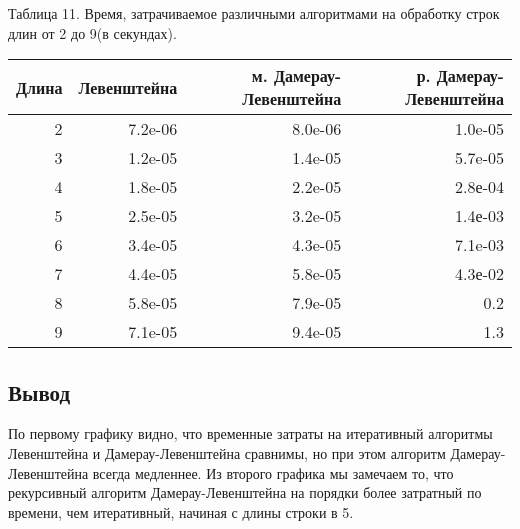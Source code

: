 \documentclass[a4paper, 14pt]{article}
\begin{document}
\begin{center}
\begin{flushleft}
\begin{center}
\begin{center}
      \begin{center}
      \newpage
  	Таблица 11. Время, затрачиваемое различными алгоритмами на обработку строк длин от 2 до 9(в секундах).
	\end{center}
	    \begin{tabular}{ | r | r | r | r | }
        \hline
Длина & Левенштейна & м. Дамерау-Левенштейна & р. Дамерау-Левенштейна \\ \hline
2 & 7.2e-06 & 8.0e-06 & 1.0e-05\\
3 & 1.2e-05 & 1.4e-05 & 5.7e-05\\
4 & 1.8e-05 & 2.2e-05 & 2.8е-04\\
5 & 2.5e-05 & 3.2e-05 & 1.4е-03\\
6 & 3.4e-05 & 4.3e-05 & 7.1e-03\\
7 & 4.4e-05 & 5.8e-05 & 4.3е-02\\
8 & 5.8e-05 & 7.9e-05 & 0.2\\
9 & 7.1e-05 & 9.4e-05 & 1.3\\
\hline
        \end{tabular}

\end{center}
	\begin{flushleft}
	\begin{center}
	\subsection{Вывод}
	\end{center}	
	По первому графику видно, что временные затраты на итеративный алгоритмы Левенштейна и Дамерау-Левенштейна сравнимы, но при этом алгоритм Дамерау-Левенштейна всегда медленнее. Из второго графика мы замечаем то, что рекурсивный алгоритм Дамерау-Левенштейна на порядки более затратный по времени, чем итеративный, начиная с длины строки в 5.
	\end{flushleft}
        
    \end{center}

    \begin{center}
    	\newpage

\end{center}
\end{flushleft}
\end{center}
\end{document}
